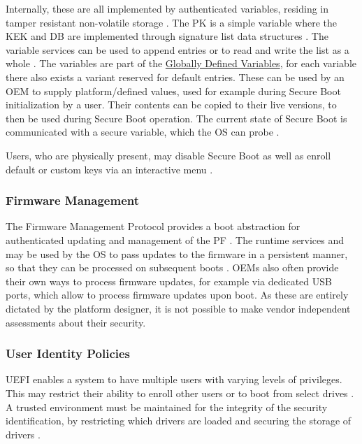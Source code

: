 Internally, these are all implemented by authenticated variables, residing in tamper resistant non-volatile storage \cite[Section 32.3]{uefi-spec}.
The \ac{PK} is a simple variable where the \ac{KEK} and \ac{DB} are implemented through signature list data structures \cite[Section 32.4.1]{uefi-spec}.
The variable services can be used to append entries or to read and write the list as a whole \cite[Sections 32.3.5 and 32.5.3]{uefi-spec}.
The variables are part of the \hyperref[sec:uefi-pi:uefi:variables]{Globally Defined Variables}, for each variable there also exists a variant reserved for default entries.
These can be used by an \ac{OEM} to supply platform\-/defined values, used for example during Secure Boot initialization by a user.
Their contents can be copied to their live versions, to then be used during Secure Boot operation.
The current state of Secure Boot is communicated with a secure variable, which the \ac{OS} can probe \cite[Section 3.3]{uefi-spec}.

Users, who are physically present, may disable Secure Boot as well as enroll default or custom keys via an interactive menu \cite[Section 3.3]{uefi-spec}.

\subsubsection{Firmware Management}

The Firmware Management Protocol provides a boot abstraction for authenticated updating and management of the \ac{PF} \cite[Section 23]{uefi-spec}.
The runtime services  and  may be used by the \ac{OS} to pass updates to the firmware in a persistent manner, so that they can be processed on subsequent boots \cite[Section 23.3]{uefi-spec}.
\acp{OEM} also often provide their own ways to process firmware updates, for example via dedicated \ac{USB} ports, which allow to process firmware updates upon boot.
As these are entirely dictated by the platform designer, it is not possible to make vendor independent assessments about their security.

\subsubsection{User Identity Policies}

\ac{UEFI} enables a system to have multiple users with varying levels of privileges.
This may restrict their ability to enroll other users or to boot from select drives \cite[Section 36.1.2]{uefi-spec}.
A trusted environment must be maintained for the integrity of the security identification, by restricting which drivers are loaded and securing the storage of drivers \cite[Section 36.1.4]{uefi-spec}.